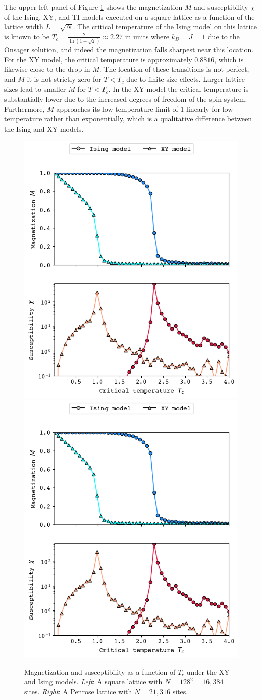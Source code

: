 \documentclass[amsmath,amssymb,aps,twocolumn]{revtex4-2}
\begin{document}
The upper left panel of Figure \ref{fig:square} shows the magnetization $M$ and susceptibility $\chi$ of the Ising, XY, and TI models executed on a square lattice as a function of the lattice width $L = \sqrt{N}$. The critical temperature of the Ising model on this lattice is known to be $T_c = \frac{2}{\ln (1 + \sqrt{2})} \approx 2.27$ in units where $k_B = J = 1$ due to the Onsager solution, and indeed the magnetization falls sharpest near this location. For the XY model, the critical temperature is approximately $0.8816$, which is likewise close to the drop in $M$. The location of these transitions is not perfect, and $M$ it is not strictly zero for $T<T_c$ due to finite-size effects. Larger lattice sizes lead to smaller $M$ for $T<T_c$. In the XY model the critical temperature is substantially lower due to the increased degrees of freedom of the spin system. Furthermore, $M$ approaches its low-temperature limit of 1 linearly for low temperature rather than exponentially, which is a qualitative difference between the Ising and XY models.

\begin{figure}
  \centering
  \includegraphics[width=0.49\linewidth]{../figs/square.png}\hfill
  \includegraphics[width=0.49\linewidth]{../figs/square.png}
  \caption{Magnetization and susceptibility as a function of $T_c$ under the XY and Ising models. \textit{Left}: A square lattice with $N=128^2=16,384$ sites. \textit{Right}: A Penrose lattice with $N=21,316$ sites.}
  \label{fig:square}
\end{figure}
\end{document}
